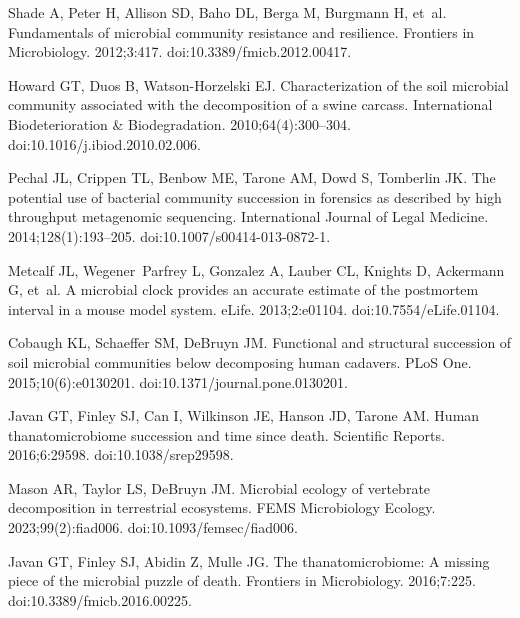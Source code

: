 \documentclass[
  10pt,
  letterpaper,
]{article}
\begin{document}
\nolinenumbers
\begin{thebibliography}{10}

  Shade A, Peter H, Allison SD, Baho DL, Berga M, Burgmann H, et~al.
  \newblock Fundamentals of microbial community resistance and resilience.
  \newblock Frontiers in Microbiology. 2012;3:417.
  \newblock doi:{10.3389/fmicb.2012.00417}.
  
  Howard GT, Duos B, Watson-Horzelski EJ.
  \newblock Characterization of the soil microbial community associated with the
    decomposition of a swine carcass.
  \newblock International Biodeterioration \& Biodegradation.
    2010;64(4):300--304.
  \newblock doi:{10.1016/j.ibiod.2010.02.006}.
  
  Pechal JL, Crippen TL, Benbow ME, Tarone AM, Dowd S, Tomberlin JK.
  \newblock The potential use of bacterial community succession in forensics as
    described by high throughput metagenomic sequencing.
  \newblock International Journal of Legal Medicine. 2014;128(1):193--205.
  \newblock doi:{10.1007/s00414-013-0872-1}.
  
  Metcalf JL, Wegener~Parfrey L, Gonzalez A, Lauber CL, Knights D, Ackermann G,
    et~al.
  \newblock A microbial clock provides an accurate estimate of the postmortem
    interval in a mouse model system.
  \newblock eLife. 2013;2:e01104.
  \newblock doi:{10.7554/eLife.01104}.
  
  Cobaugh KL, Schaeffer SM, DeBruyn JM.
  \newblock Functional and structural succession of soil microbial communities
    below decomposing human cadavers.
  \newblock PLoS One. 2015;10(6):e0130201.
  \newblock doi:{10.1371/journal.pone.0130201}.
  
  Javan GT, Finley SJ, Can I, Wilkinson JE, Hanson JD, Tarone AM.
  \newblock Human thanatomicrobiome succession and time since death.
  \newblock Scientific Reports. 2016;6:29598.
  \newblock doi:{10.1038/srep29598}.
  
  Mason AR, Taylor LS, DeBruyn JM.
  \newblock Microbial ecology of vertebrate decomposition in terrestrial
    ecosystems.
  \newblock FEMS Microbiology Ecology. 2023;99(2):fiad006.
  \newblock doi:{10.1093/femsec/fiad006}.
  
  Javan GT, Finley SJ, Abidin Z, Mulle JG.
  \newblock The thanatomicrobiome: {A} missing piece of the microbial puzzle of
    death.
  \newblock Frontiers in Microbiology. 2016;7:225.
  \newblock doi:{10.3389/fmicb.2016.00225}.
  

\end{thebibliography}
\end{document}
